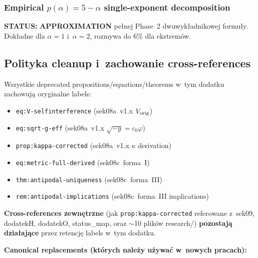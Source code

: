\subsubsection{Empirical $p(\alpha)=5-\alpha$ single-exponent
decomposition}\label{app:mass-formula-p-alpha}

\textbf{STATUS:} \textbf{APPROXIMATION} pełnej Phase~2 dwuwykładnikowej
formu\l{}y. Dok\l{}adne dla $\alpha=1$ i~$\alpha=2$, rozmywa do 6\% dla
ekstrem\'ow.

\subsection{Polityka cleanup i~zachowanie cross-references}%
\label{app:cleanup-policy}

Wszystkie deprecated propositions/equations/theorems w~tym dodatku
zachowuj\k{a} oryginalne labels:

\begin{itemize}\itemsep0pt
  \item \texttt{eq:V-selfinterference} (sek08a~v1.x $V_{\rm orig}$)
  \item \texttt{eq:sqrt-g-eff} (sek08a~v1.x $\sqrt{-g}=c_0\varphi$)
  \item \texttt{prop:kappa-corrected} (sek08a~v1.x $\kappa$ derivation)
  \item \texttt{eq:metric-full-derived} (sek08c~forma~I)
  \item \texttt{thm:antipodal-uniqueness} (sek08c~forma~III)
  \item \texttt{rem:antipodal-implications} (sek08c~forma~III implications)
\end{itemize}

\textbf{Cross-references zewn\k{e}trzne} (jak \texttt{prop:kappa-corrected}
referowane z~sek09, dodatekH, dodatekO, status\_map, oraz $\sim$10 plik\'ow
research/) \textbf{pozostaj\k{a} dzia\l{}aj\k{a}ce} przez retencj\k{e}
labels w~tym dodatku.

\textbf{Canonical replacements (kt\'orych nale\.zy u\.zywa\'c w~nowych pracach):}

